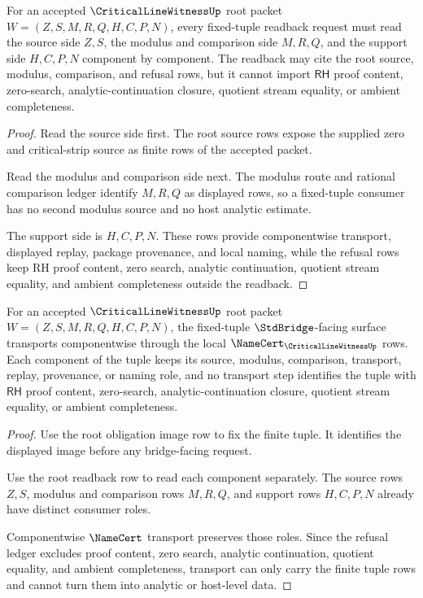 \begin{theorem}
\label{thm:critical-line-witness-root-readback-row}
For an accepted $\CriticalLineWitnessUp$ root packet $W=(Z,S,M,R,Q,H,C,P,N)$, every fixed-tuple readback request must read the source side $Z,S$, the modulus and comparison side $M,R,Q$, and the support side $H,C,P,N$ component by component. The readback may cite the root source, modulus, comparison, and refusal rows, but it cannot import $\mathsf{RH}$ proof content, zero-search, analytic-continuation closure, quotient stream equality, or ambient completeness.
\end{theorem}
\begin{proof}
Read the source side first. The root source rows expose the supplied zero and critical-strip source as finite rows of the accepted packet.

Read the modulus and comparison side next. The modulus route and rational comparison ledger identify $M,R,Q$ as displayed rows, so a fixed-tuple consumer has no second modulus source and no host analytic estimate.

The support side is $H,C,P,N$. These rows provide componentwise transport, displayed replay, package provenance, and local naming, while the refusal rows keep RH proof content, zero search, analytic continuation, quotient stream equality, and ambient completeness outside the readback.
\end{proof}

\begin{theorem}
\label{thm:critical-line-witness-root-componentwise-namecert-transport}
For an accepted $\CriticalLineWitnessUp$ root packet $W=(Z,S,M,R,Q,H,C,P,N)$, the fixed-tuple $\StdBridge$-facing surface transports componentwise through the local $\NameCert_{\CriticalLineWitnessUp}$ rows. Each component of the tuple keeps its source, modulus, comparison, transport, replay, provenance, or naming role, and no transport step identifies the tuple with $\mathsf{RH}$ proof content, zero-search, analytic-continuation closure, quotient stream equality, or ambient completeness.
\end{theorem}
\begin{proof}
Use the root obligation image row to fix the finite tuple. It identifies the displayed image before any bridge-facing request.

Use the root readback row to read each component separately. The source rows $Z,S$, modulus and comparison rows $M,R,Q$, and support rows $H,C,P,N$ already have distinct consumer roles.

Componentwise $\NameCert$ transport preserves those roles. Since the refusal ledger excludes proof content, zero search, analytic continuation, quotient equality, and ambient completeness, transport can only carry the finite tuple rows and cannot turn them into analytic or host-level data.
\end{proof}
